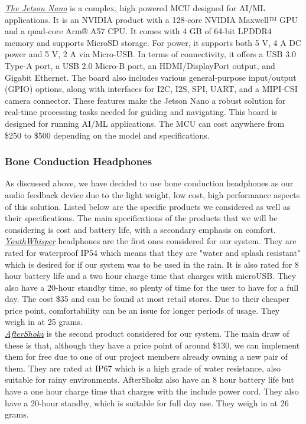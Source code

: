 \noindent \underline{\textit{The Jetson Nano}} is a complex, high powered MCU designed for AI/ML applications. It is an NVIDIA product with a 128-core NVIDIA Maxwell™ GPU and a quad-core Arm® A57 CPU. It comes with 4 GB of 64-bit LPDDR4 memory and supports MicroSD storage. For power, it supports both 5 V, 4 A DC power and 5 V, 2 A via Micro-USB. In terms of connectivity, it offers a USB 3.0 Type-A port, a USB 2.0 Micro-B port, an HDMI/DisplayPort output, and Gigabit Ethernet. The board also includes various general-purpose input/output (GPIO) options, along with interfaces for I2C, I2S, SPI, UART, and a MIPI-CSI camera connector. These features make the Jetson Nano a robust solution for real-time processing tasks needed for guiding and navigating. This board is designed for running AI/ML applications. The MCU can cost anywhere from \$250 to \$500 depending on the model and specifications.\\

\subsubsection{Bone Conduction Headphones}
\noindent As discussed above, we have decided to use bone conduction headphones as our audio feedback device due to the light weight, low cost, high performance aspects of this solution. Listed below are the specific products we considered as well as their specifications. The main specifications of the products that we will be considering is cost and battery life, with a secondary emphasis on comfort. \\

\noindent \underline{\textit{YouthWhisper}} headphones are the first ones considered for our system. They are rated for waterproof IP54 which means that they are "water and splash resistant" which is desired for if our system was to be used in the rain. It is also rated for 8 hour battery life  and a two hour charge time that charges with microUSB. They also have a 20-hour standby time, so plenty of time for the user to have for a full day. The cost \$35 and can be found at most retail stores. Due to their cheaper price point, comfortability can be an issue for longer periods of usage. They weigh in at 25 grams. \\

\noindent \underline{\textit{AfterShokz}} is the second product considered for our system. The main draw of these is that, although they have a price point of around \$130, we can implement them for free due to one of our project members already owning a new pair of them. They are rated at IP67 which is a high grade of water resistance, also suitable for rainy environments. AfterShokz also have an 8 hour battery life but have a one hour charge time that charges with the include power cord. They also have a 20-hour standby, which is suitable for full day use. They weigh in at 26 grams. \\


